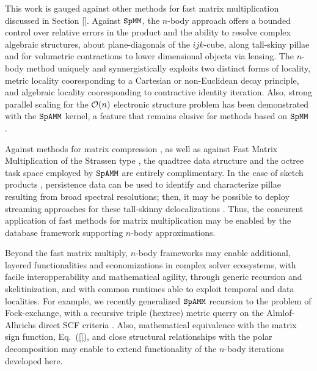 \documentclass[letterpaper,twocolumn,amsmath,amsfont,amssymb,english,aps,jcp,preprintnumbers,groupaddress,nofootinbib,tightenlines,floatfix]{revtex4}
\theoremstyle{plain}
\theoremstyle{remark}
\theoremstyle{plain}
\begin{document}
This work is gauged against other methods for fast matrix multiplication discussed in Section \ref{}. 
Against $\tt SpMM$, the $n$-body approach offers a bounded control over relative errors in 
the product and the ability to resolve complex algebraic structures, about plane-diagonals of the $ijk$-cube, 
along tall-skiny pillae and for volumetric contractions to lower dimensional objects via lensing. 
The $n$-body method uniquely and synnergistically exploits two distinct forms of locality, metric locality cooresponding to 
a Cartesian or non-Euclidean decay principle, and algebraic locality cooresponding to contractive identity iteration. 
Also, strong parallel scaling for the ${\cal{O}}(n)$ electronic structure problem has been demonstrated with the $\tt SpAMM$ kernel, 
a feature that remains elusive for methods based on $\tt SpMM$ \cite{Bowler}.

Against methods for matrix compression \cite{}, as well as against Fast Matrix Multiplication of the Strassen type \cite{}, 
the quadtree data structure and the octree task space employed by $\tt SpAMM$ are entirely complimentary.  
In the case of sketch products \cite{}, persistence data can be used to identify and characterize pillae resulting 
from broad spectral resolutions; then, it may be possible to deploy streaming approaches for these tall-skinny delocalizations \cite{}.
Thus, the concurent application of fast methods for matrix multiplication may be enabled by the database framework supporting 
$n$-body approximations.  

Beyond the fast matrix multiply, $n$-body frameworks may enable additional, layered functionalities and economizations 
in complex solver ecosystems, with facile interopperability and mathematical agility, 
through generic recursion and skelitinization, and with common runtimes able to exploit temporal and data localities.
For example, we recently generalized $\tt SpAMM$ recursion to the problem of Fock-exchange, with a recursive triple (hextree) 
metric querry on the Almlof-Alhrichs direct SCF criteria \cite{}.  
Also, mathematical equivalence with the matrix sign function, Eq.~(\ref{}), and close structural relationships with the 
polar decomposition may enable to extend functionality of the $n$-body iterations developed here. 
\end{document}
